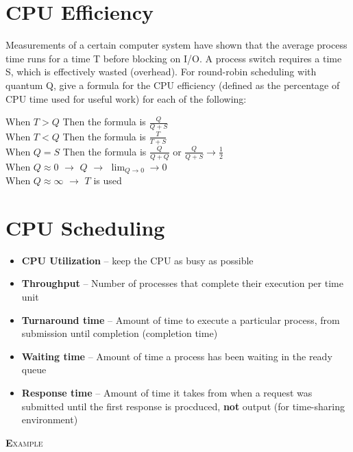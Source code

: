 \documentclass{article}
\newcommand{\smallcaps}[1]{\textsc{\textbf #1}\\}
\begin{document}
    \section*{CPU Efficiency}
    Measurements of a certain computer system have shown that the average process time runs for a time T before blocking on I/O. A process switch requires a time S, which is effectively wasted (overhead). For round-robin scheduling with quantum Q, give a formula for the CPU efficiency (defined as the percentage of CPU time used for useful work) for each of the following:

    \begin{center}
      When $T > Q$ Then the formula is $\frac{Q}{Q+S}$ \\
      When $T < Q$ Then the formula is $\frac{T}{T+S}$ \\
      When $Q = S$ Then the formula is $\frac{Q}{Q+Q}$ or $\frac{Q}{Q+S} \to \frac{1}{2}$\\
      When $Q \approx 0$ $\to$ $Q$ $\to$ $\lim_{Q\to0} \to 0$\\
      When $Q \approx \infty$ $\to$ $T$ is used \\
    \end{center}

    \section*{CPU Scheduling}

    \begin{itemize}
      \item \textbf{{\color{blue} CPU Utilization}} -- keep the CPU as busy as possible
      \item \textbf{{\color{blue} Throughput}} -- Number of processes that complete their execution per time unit
      \item \textbf{{\color{blue} Turnaround time}} -- Amount of time to execute a particular process, from submission until completion (completion time)
      \item \textbf{{\color{blue} Waiting time}} -- Amount of time a process has been waiting in the ready queue
      \item \textbf{{\color{blue} Response time}} -- Amount of time it takes from when a request was submitted until the first response is procduced, \textbf{not} output (for time-sharing environment)
    \end{itemize}

    \smallcaps{Example}
\end{document}
